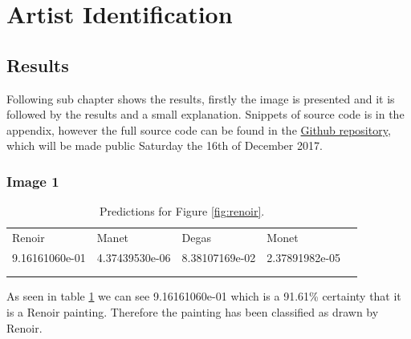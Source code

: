 \section{Artist Identification}

\subsection{Results}
\label{section:Results}
Following sub chapter shows the results, firstly the image is presented and it is followed by the results and a small explanation. Snippets of source code is in the appendix, however the full source code can be found in the \textcolor{blue}{\href{https://github.com/Spiderixius/DataScienceAssignments2017/tree/master/AssignmentEsmail}{Github repository}}, which will be made public Saturday the 16th of December 2017.



\subsubsection*{Image 1}

\begin{table}[H]
    \centering
    \caption{Predictions for Figure \ref{fig:renoir}.}
    \label{tbl:renoir_predictions}
    \begin{tabular}{lllll}
    \cline{1-4}
    \multicolumn{1}{|l|}{Renoir}         & \multicolumn{1}{l|}{Manet}          & \multicolumn{1}{l|}{Degas}          & \multicolumn{1}{l|}{Monet}          &  \\ \cline{1-4}
    \multicolumn{1}{|l|}{9.16161060e-01} & \multicolumn{1}{l|}{4.37439530e-06} & \multicolumn{1}{l|}{8.38107169e-02} & \multicolumn{1}{l|}{2.37891982e-05} &  \\ \cline{1-4}
                                         &                                     &                                     &                                     &  \\
                                         &                                     &                                     &                                     & 
    \end{tabular}
\end{table}


As seen in table \ref{tbl:renoir_predictions} we can see 9.16161060e-01 which is a 91.61\% certainty that it is a Renoir painting. Therefore the painting has been classified as drawn by Renoir.



